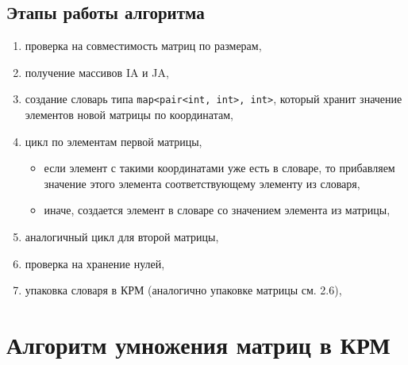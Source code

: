 \subsection*{Этапы работы алгоритма}
\begin{enumerate}
	\item проверка на совместимость матриц по размерам,
	
	\item получение массивов IA и JA,
	
	\item создание словарь типа \texttt{map<pair<int, int>, int>}, который хранит значение элементов новой матрицы по координатам,
	\item цикл по элементам первой матрицы,
	\begin{itemize}
		\item если элемент с такими координатами уже есть в словаре, то прибавляем значение этого элемента соответствующему элементу из словаря,
		\item иначе, создается элемент в словаре со значением элемента из матрицы,
	\end{itemize}
	
	\item аналогичный цикл для второй матрицы,
	
	\item проверка на хранение нулей,
	
	\item упаковка словаря в КРМ (аналогично упаковке матрицы см. 2.6),
\end{enumerate}

\section{Алгоритм умножения матриц в КРМ}

